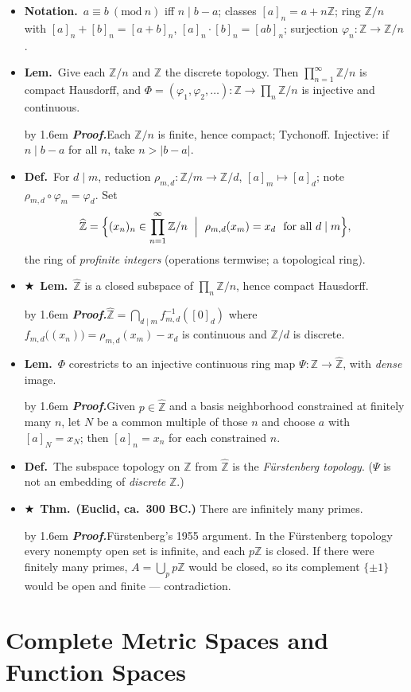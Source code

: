 \documentclass[12pt,a4paper]{article}
\newcommand{\Dfn}{\textbf{Def.}~}
\newcommand{\Thm}{\textbf{Thm.}~}
\newcommand{\Lem}{\textbf{Lem.}~}
\newcommand{\Ntn}{\textbf{Notation.}~}
\newcommand{\Key}{$\bigstar$~}                  %
\newcommand{\Pf}[1]{%
  \par\addvspace{7pt}\nopagebreak
  \begingroup
    \advance\leftskip by 1.6em
    \parindent=0pt \small\color{prf}%
    \textbf{\textit{Proof.}}\enspace #1\par
  \endgroup
  \addvspace{9pt}}
\newenvironment{BL}%
  {\begin{itemize}[leftmargin=1.4em,labelsep=0.55em,itemsep=11pt,topsep=11pt,parsep=0pt]}%
  {\end{itemize}}
\newcommand{\ZZ}{\mathbb{Z}}
\newcommand{\Zh}{\widehat{\ZZ}}
\begin{document}
\begin{BL}
\item \Ntn $a\equiv b\ (\mathrm{mod}\ n)$ iff $n\mid b-a$; classes $[a]_n=a+n\ZZ$;
      ring $\ZZ/n$ with $[a]_n+[b]_n=[a+b]_n$, $[a]_n\cdot[b]_n=[ab]_n$;
      surjection $\varphi_n\colon\ZZ\to\ZZ/n$.
\item \Lem Give each $\ZZ/n$ and $\ZZ$ the discrete topology. Then
      $\prod_{n=1}^{\infty}\ZZ/n$ is compact Hausdorff, and
      \(\Phi=(\varphi_1,\varphi_2,\dots)\colon\ZZ\to\prod_{n}\ZZ/n\)
      is injective and continuous.
\Pf{Each $\ZZ/n$ is finite, hence compact; Tychonoff. Injective: if $n\mid b-a$ for all $n$,
take $n>|b-a|$.}
\item \Dfn For $d\mid m$, reduction $\rho_{m,d}\colon\ZZ/m\to\ZZ/d$, $[a]_m\mapsto[a]_d$;
      note $\rho_{m,d}\circ\varphi_m=\varphi_d$. Set
  \[
    \Zh=\Bigl\{(x_n)_{n}\in\prod_{n=1}^{\infty}\ZZ/n \ \Bigm|\
        \rho_{m,d}(x_m)=x_d\ \text{ for all } d\mid m\Bigr\},
  \]
  the ring of \emph{profinite integers} (operations termwise; a topological ring).
\item \Key\Lem $\Zh$ is a closed subspace of $\prod_n\ZZ/n$, hence compact Hausdorff.
\Pf{$\Zh=\bigcap_{d\mid m}f_{m,d}^{-1}([0]_d)$ where
$f_{m,d}\bigl((x_n)\bigr)=\rho_{m,d}(x_m)-x_d$ is continuous and $\ZZ/d$ is discrete.}
\item \Lem $\Phi$ corestricts to an injective continuous ring map $\Psi\colon\ZZ\to\Zh$,
      with \emph{dense} image.
\Pf{Given $p\in\Zh$ and a basis neighborhood constrained at finitely many $n$, let $N$ be a
common multiple of those $n$ and choose $a$ with $[a]_N=x_N$; then $[a]_n=x_n$ for each
constrained $n$.}
\item \Dfn The subspace topology on $\ZZ$ from $\Zh$ is the \emph{F\"urstenberg topology}.
      ($\Psi$ is not an embedding of \emph{discrete} $\ZZ$.)
\item \Key\Thm \textbf{(Euclid, ca.\ 300 BC.)} There are infinitely many primes.
\Pf{F\"urstenberg's 1955 argument. In the F\"urstenberg topology every nonempty open set is
infinite, and each $p\ZZ$ is closed. If there were finitely many primes,
$A=\bigcup_{p}p\ZZ$ would be closed, so its complement $\{\pm1\}$ would be open and
finite --- contradiction.}
\end{BL}

\section{Complete Metric Spaces and Function Spaces}
\end{document}
